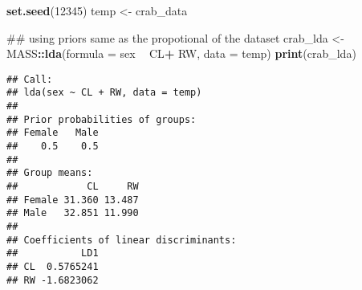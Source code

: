\documentclass[]{article}
\newenvironment{Shaded}{\begin{snugshade}}{\end{snugshade}}
\newcommand{\KeywordTok}[1]{\textcolor[rgb]{0.13,0.29,0.53}{\textbf{#1}}}
\newcommand{\DataTypeTok}[1]{\textcolor[rgb]{0.13,0.29,0.53}{#1}}
\newcommand{\DecValTok}[1]{\textcolor[rgb]{0.00,0.00,0.81}{#1}}
\newcommand{\StringTok}[1]{\textcolor[rgb]{0.31,0.60,0.02}{#1}}
\newcommand{\OperatorTok}[1]{\textcolor[rgb]{0.81,0.36,0.00}{\textbf{#1}}}
\newcommand{\NormalTok}[1]{#1}
\begin{document}
\begin{Shaded}
\begin{Highlighting}[]
\KeywordTok{set.seed}\NormalTok{(}\DecValTok{12345}\NormalTok{)}
\NormalTok{temp <-}\StringTok{ }\NormalTok{crab_data}

\NormalTok{## using priors same as the propotional of the dataset}
\NormalTok{crab_lda <-}\StringTok{ }\NormalTok{MASS}\OperatorTok{::}\KeywordTok{lda}\NormalTok{(}\DataTypeTok{formula =}\NormalTok{ sex }\OperatorTok{~}\StringTok{ }\NormalTok{CL}\OperatorTok{+}\StringTok{ }\NormalTok{RW, }\DataTypeTok{data =}\NormalTok{ temp)}
\KeywordTok{print}\NormalTok{(crab_lda)}
\end{Highlighting}
\end{Shaded}

\begin{verbatim}
## Call:
## lda(sex ~ CL + RW, data = temp)
## 
## Prior probabilities of groups:
## Female   Male 
##    0.5    0.5 
## 
## Group means:
##            CL     RW
## Female 31.360 13.487
## Male   32.851 11.990
## 
## Coefficients of linear discriminants:
##           LD1
## CL  0.5765241
## RW -1.6823062
\end{verbatim}

\begin{Shaded}
\end{Shaded}
\end{document}
